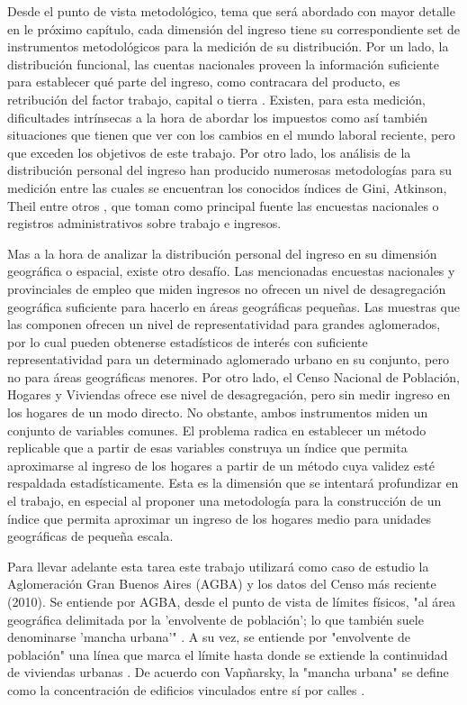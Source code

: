 Desde el punto de vista metodológico, tema que será abordado con mayor detalle en le próximo capítulo, cada dimensión del ingreso tiene su correspondiente set de instrumentos metodológicos para la medición de su distribución. Por un lado, la distribución funcional, las cuentas nacionales proveen la información suficiente para establecer qué parte del ingreso, como contracara del producto, es retribución del factor trabajo, capital o tierra \cite{grania}. Existen, para esta medición, dificultades intrínsecas a la hora de abordar los impuestos como así también situaciones que tienen que ver con los cambios en el mundo laboral reciente, pero que exceden los objetivos de este trabajo. Por otro lado, los análisis de la distribución personal del ingreso han producido numerosas metodologías para su medición entre las cuales se encuentran los conocidos índices de Gini, Atkinson, Theil entre otros \cite{worldbank}, que toman como principal fuente las encuestas nacionales o registros administrativos sobre trabajo e ingresos.

Mas a la hora de analizar la distribución personal del ingreso en su dimensión geográfica o espacial, existe otro desafío. Las mencionadas encuestas nacionales y provinciales de empleo que miden ingresos no ofrecen un nivel de desagregación geográfica suficiente para hacerlo en áreas geográficas pequeñas. Las muestras que las componen ofrecen un nivel de representatividad para grandes aglomerados, por lo cual pueden obtenerse estadísticos de interés con suficiente representatividad para un determinado aglomerado urbano en su conjunto, pero no para áreas geográficas menores. Por otro lado, el Censo Nacional de Población, Hogares y Viviendas ofrece ese nivel de desagregación, pero sin medir ingreso en los hogares de un modo directo. No obstante, ambos instrumentos miden un conjunto de variables comunes. El problema radica en establecer un método replicable que a partir de esas variables construya un índice que permita aproximarse al ingreso de los hogares a partir de un método cuya validez esté respaldada estadísticamente. Esta es la dimensión que se intentará profundizar en el trabajo, en especial al proponer una metodología para la construcción de un índice que permita aproximar un ingreso de los hogares medio para unidades geográficas de pequeña escala.

Para llevar adelante esta tarea este trabajo utilizará como caso de estudio la Aglomeración Gran Buenos Aires (AGBA) y los datos del Censo más reciente (2010). Se entiende por AGBA, desde el punto de vista de límites físicos, "al área geográfica delimitada por la 'envolvente de población'; lo que también suele denominarse 'mancha urbana'" \cite{indec2003e}. A su vez, se entiende por "envolvente de población" una línea que marca el límite hasta donde se extiende la continuidad de viviendas urbanas \cite{indec2003e}. De acuerdo con Vapñarsky, la "mancha urbana" se define como la concentración de edificios vinculados entre sí por calles \cite{vapniarsky1995,vapniarsky1998}. 

